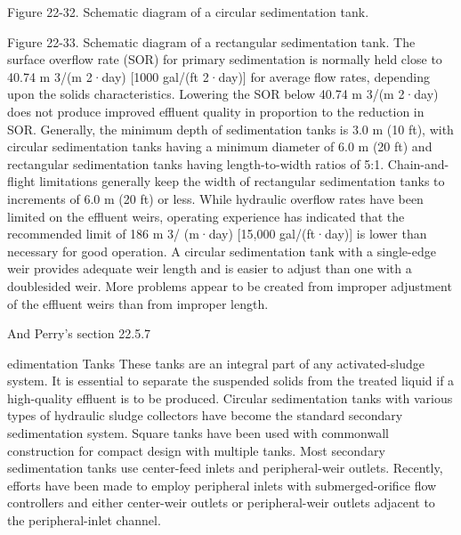Figure 22-32. Schematic diagram of a circular sedimentation tank.

Figure 22-33. Schematic diagram of a rectangular sedimentation tank.
The surface overflow rate (SOR) for primary sedimentation is normally held close to 40.74 m 3/(m 2·day) [1000 gal/(ft 2·day)] for average flow rates, depending upon the solids characteristics. Lowering the SOR below 40.74 m 3/(m 2·day) does not produce improved effluent quality in proportion to the reduction in SOR. Generally, the minimum depth of sedimentation tanks is 3.0 m (10 ft), with circular sedimentation tanks having a minimum diameter of 6.0 m (20 ft) and rectangular sedimentation tanks having length-to-width ratios of 5:1. Chain-and-flight limitations generally keep the width of rectangular sedimentation tanks to increments of 6.0 m (20 ft) or less. While hydraulic overflow rates have been limited on the effluent weirs, operating experience has indicated that the recommended limit of 186 m 3/ (m·day) [15,000 gal/(ft·day)] is lower than necessary for good operation. A circular sedimentation tank with a single-edge weir provides adequate weir length and is easier to adjust than one with a doublesided weir. More problems appear to be created from improper adjustment of the effluent weirs than from improper length.


And Perry's section 22.5.7

edimentation Tanks These tanks are an integral part of any activated-sludge system. It is essential to separate the suspended solids from the treated liquid if a high-quality effluent is to be produced. Circular sedimentation tanks with various types of hydraulic sludge collectors have become the standard secondary sedimentation system. Square tanks have been used with commonwall construction for compact design with multiple tanks. Most secondary sedimentation tanks use center-feed inlets and peripheral-weir outlets. Recently, efforts have been made to employ peripheral inlets with submerged-orifice flow controllers and either center-weir outlets or peripheral-weir outlets adjacent to the peripheral-inlet channel.